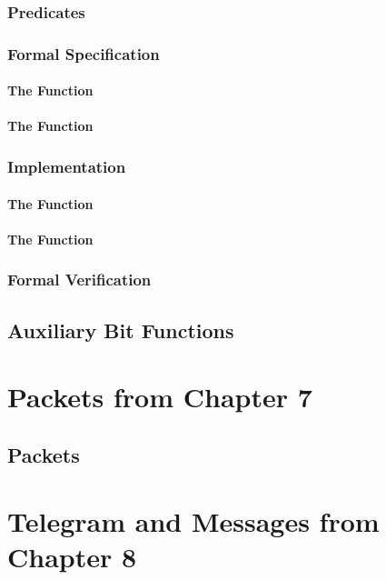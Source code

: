 \documentclass[paper=a4,12pt,DIV16,BCOR8mm,twoside]{scrreprt}
\begin{document}
\section{Predicates}

\section{Formal Specification}
\subsection{The Function }
\subsection{The Function }

\section{Implementation}
\subsection{The Function }
\subsection{The Function }

\section{Formal Verification}

\chapter{Auxiliary Bit Functions}

\part{Packets from Chapter 7}

\chapter{Packets}

\part{Telegram and Messages from Chapter 8}
\end{document}
